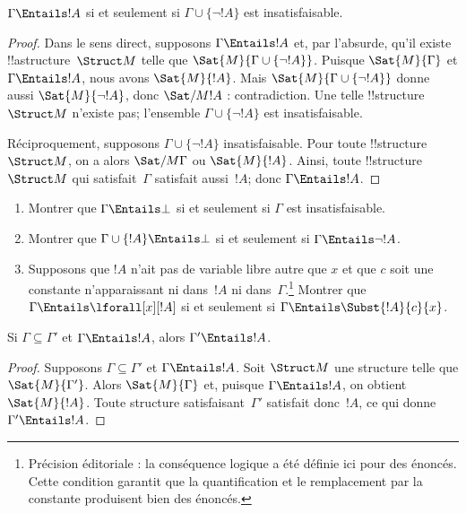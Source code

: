 \documentclass[../../../include/open-logic-section]{subfiles}
\begin{document}
\begin{prop}
$\Gamma \Entails !A$ si et seulement si
$\Gamma \cup \{\lnot !A\}$ est insatisfaisable.
\end{prop}

\begin{proof}
Dans le sens direct, supposons $\Gamma \Entails !A$ et, par
l'absurde, qu'il existe !!a{structure}~$\Struct M$ telle que
$\Sat{M}{\Gamma \cup \{ \lnot !A \}}$. Puisque
$\Sat{M}{\Gamma}$ et $\Gamma \Entails !A$, nous avons
$\Sat{M}{!A}$. Mais $\Sat{M}{\Gamma\cup \{ \lnot !A \}}$ donne
aussi $\Sat{M}{\lnot !A}$, donc $\Sat/{M}{!A}$ : contradiction.
Une telle !!{structure}~$\Struct M$ n'existe pas; l'ensemble
$\Gamma \cup \{ \lnot !A \}$ est insatisfaisable.

Réciproquement, supposons $\Gamma \cup \{ \lnot !A \}$
insatisfaisable. Pour toute !!{structure}~$\Struct M$, on a alors
$\Sat/{M}{\Gamma}$ ou $\Sat{M}{!A}$. Ainsi, toute !!{structure}
$\Struct M$ qui satisfait~$\Gamma$ satisfait aussi~$!A$;
donc $\Gamma \Entails !A$.
\end{proof}

\begin{prob}
\begin{enumerate}
\item Montrer que $\Gamma \Entails \bot$ si et seulement si
  $\Gamma$ est insatisfaisable.
\item Montrer que $\Gamma \cup \{!A\} \Entails \bot$ si et seulement si
  $\Gamma \Entails \lnot !A$.
\item Supposons que $!A$ n'ait pas de variable libre autre que $x$ et que $c$ soit une constante n'apparaissant ni dans~$!A$ ni dans~$\Gamma$.\footnote{Précision éditoriale : la conséquence logique a été définie ici pour des énoncés. Cette condition garantit que la quantification et le remplacement par la constante produisent bien des énoncés.}
  Montrer que $\Gamma \Entails \lforall[x][!A]$ si et seulement si
  $\Gamma \Entails
  \Subst{!A}{c}{x}$.
\end{enumerate}
\end{prob}

\begin{prop}
Si $\Gamma \subseteq \Gamma'$ et $\Gamma \Entails !A$, alors
$\Gamma' \Entails !A$.
\end{prop}

\begin{proof}
Supposons $\Gamma \subseteq \Gamma'$ et $\Gamma \Entails !A$.
Soit $\Struct M$ une structure telle que $\Sat{M}{\Gamma'}$.
Alors $\Sat{M}{\Gamma}$ et, puisque $\Gamma \Entails !A$,
on obtient $\Sat{M}{!A}$. Toute structure satisfaisant~$\Gamma'$
satisfait donc~$!A$, ce qui donne $\Gamma' \Entails !A$.
\end{proof}
\end{document}

